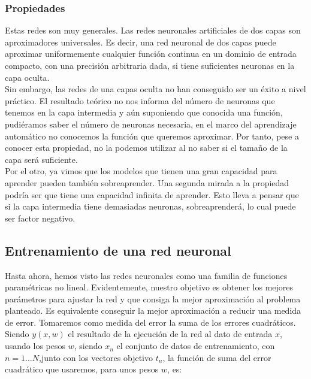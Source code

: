 \subsubsection{Propiedades}

Estas redes son muy generales. Las redes neuronales artificiales de dos capas son aproximadores universales. Es decir, una red neuronal de dos capas puede aproximar uniformemente cualquier función continua en un dominio de entrada compacto, con una precisión arbitraria dada, si tiene suficientes neuronas en la capa oculta\cite{Cybenco}\cite{Hornik}.\\

Sin embargo, las redes de una capas oculta no han conseguido ser un éxito a nivel práctico. El resultado teórico no nos informa del número de neuronas que tenemos en la capa intermedia y aún suponiendo que conocida una función, pudiéramos saber el número de neuronas necesaria, en el marco del aprendizaje automático no conocemos la función que queremos aproximar. Por tanto, pese a conocer esta propiedad, no la podemos utilizar al no saber si el tamaño de la capa será suficiente.\\

Por el otro, ya vimos que los modelos que tienen una gran capacidad para aprender pueden también sobreaprender. Una segunda mirada a la propiedad podría ser que tiene una capacidad infinita de aprender. Esto lleva a pensar que si la capa intermedia tiene demasiadas neuronas, sobreaprenderá, lo cual puede ser factor negativo.\\


\subsection{Entrenamiento de una red neuronal}

Hasta ahora, hemos visto las redes neuronales como una familia de funciones paramétricas no lineal. Evidentemente, nuestro objetivo es obtener los mejores parámetros para ajustar la red y que consiga la mejor aproximación al problema planteado. Es equivalente conseguir la mejor aproximación a reducir una medida de error. Tomaremos como medida del error la suma de los errores cuadráticos. Siendo $y(x,w)$ el resultado de la ejecución de la red al dato de entrada $x$, usando los pesos $w$, siendo ${x_n}$ el conjunto de datos de entrenamiento, con $n=1\ldots N$,junto con los vectores objetivo ${t_n}$, la función de suma del error cuadrático que usaremos, para unos pesos $w$, es:


